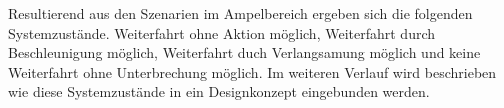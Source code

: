Resultierend aus den Szenarien im Ampelbereich ergeben sich die folgenden Systemzustände.
Weiterfahrt ohne Aktion möglich, Weiterfahrt durch Beschleunigung möglich, Weiterfahrt duch Verlangsamung möglich und keine Weiterfahrt ohne Unterbrechung möglich. Im weiteren Verlauf wird beschrieben wie diese Systemzustände in ein Designkonzept eingebunden werden.
